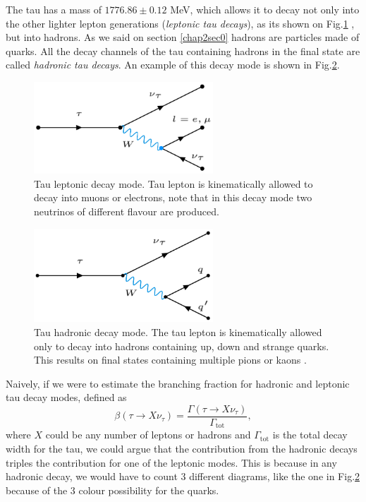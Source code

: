 The tau has a mass of $1776.86 \pm 0.12$ MeV, which allows it to decay not only into the other lighter lepton generations (\textit{leptonic tau decays}), as its shown on Fig.\ref{Fig1}  , but into hadrons. As we said on section \ref{chap2sec0} hadrons are particles made of quarks. All the decay channels of the tau containing hadrons in the final state are called \textit{hadronic tau decays}. An example of this decay mode is shown in Fig.\ref{Fig2}.
\begin{figure}[h]
	\centering
	\includegraphics[width=0.6\textwidth]{figures/Fig1}
	\caption{Tau leptonic decay mode. Tau lepton is kinematically allowed to decay into muons or electrons, note that in this decay mode two neutrinos of different flavour are produced.}
	\label{Fig1}
\end{figure}
\begin{figure}[h]
	\centering
	\includegraphics[width=0.6\textwidth]{figures/Fig2}
	\caption{Tau hadronic decay mode. The tau lepton is kinematically allowed only to decay into hadrons containing up, down and strange quarks. This results on final states containing multiple pions or kaons \cite{Davier_2006}.}
	\label{Fig2}
\end{figure}
Naively, if we were to estimate the branching fraction for hadronic and leptonic tau decay modes, defined as
\begin{equation}
	\beta(\tau\to X\nu_\tau)=\frac{\Gamma(\tau\to X\nu_\tau)}{\Gamma_{\text{tot}}},
\end{equation}
where $X$ could be any number of leptons or hadrons and $\Gamma_{\text{tot}}$ is the total decay width for the tau, we could argue that the contribution from the hadronic decays triples the contribution for one of the leptonic modes. This is because in any hadronic decay, we would have to count 3 different diagrams, like the one in Fig.\ref{Fig2} because of the 3 colour possibility for the quarks.

